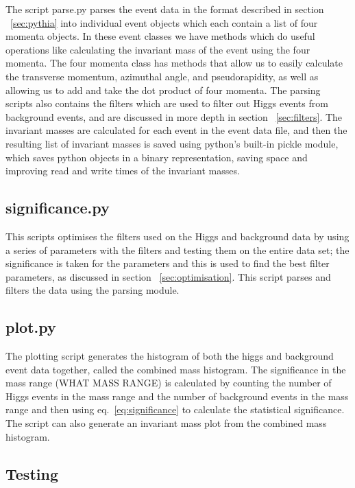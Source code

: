 \documentclass[11pt]{amsart}
\begin{document}
\begin{multicols}{2}
The script parse.py parses the event data in the format described in section ~\ref{sec:pythia} into individual event objects which each contain a list of four momenta objects. In these event classes we have methods which do useful operations like calculating the invariant mass of the event using the four momenta. The four momenta class has methods that allow us to easily calculate the transverse momentum, azimuthal angle, and pseudorapidity, as well as allowing us to add and take the dot product of four momenta. The parsing scripts also contains the filters which are used to filter out Higgs events from background events, and are discussed in more depth in section ~\ref{sec:filters}. The invariant masses are calculated for each event in the event data file, and then the resulting list of invariant masses is saved using python's built-in pickle module, which saves python objects in a binary representation, saving space and improving read and write times of the invariant masses.

\subsection{significance.py}

This scripts optimises the filters used on the Higgs and background data by using a series of parameters with the filters and testing them on the entire data set; the significance is taken for the parameters and this is used to find the best filter parameters, as discussed in section ~\ref{sec:optimisation}. This script parses and filters the data using the parsing module.

\subsection{plot.py}

The plotting script generates the histogram of both the higgs and background event data together, called the combined mass histogram. The significance in the mass range (WHAT MASS RANGE) is calculated by counting the number of Higgs events in the mass range and the number of background events in the mass range and then using eq.~\ref{eq:significance} to calculate the statistical significance. The script can also generate an invariant mass plot from the combined mass histogram.

\subsection{Testing}
\label{sec:testing}


\end{multicols}
\end{document}

